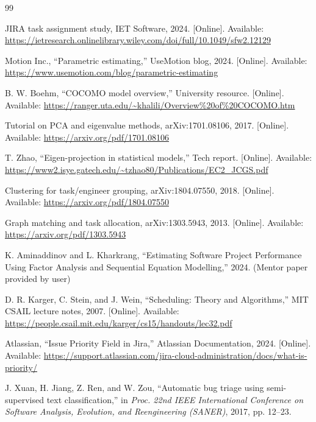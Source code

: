 \documentclass[final,1p,times]{elsarticle}
\begin{document}
\begin{thebibliography}{99}

JIRA task assignment study, IET Software, 2024. [Online]. Available: \url{https://ietresearch.onlinelibrary.wiley.com/doi/full/10.1049/sfw2.12129}

Motion Inc., ``Parametric estimating,'' UseMotion blog, 2024. [Online]. Available: \url{https://www.usemotion.com/blog/parametric-estimating}

B. W. Boehm, ``COCOMO model overview,'' University resource. [Online]. Available: \url{https://ranger.uta.edu/~khalili/Overview%20of%20COCOMO.htm}

Tutorial on PCA and eigenvalue methods, arXiv:1701.08106, 2017. [Online]. Available: \url{https://arxiv.org/pdf/1701.08106}

T. Zhao, ``Eigen-projection in statistical models,'' Tech report. [Online]. Available: \url{https://www2.isye.gatech.edu/~tzhao80/Publications/EC2_JCGS.pdf}

Clustering for task/engineer grouping, arXiv:1804.07550, 2018. [Online]. Available: \url{https://arxiv.org/pdf/1804.07550}

Graph matching and task allocation, arXiv:1303.5943, 2013. [Online]. Available: \url{https://arxiv.org/pdf/1303.5943}

K. Aminaddinov and L. Kharkrang, ``Estimating Software Project Performance Using Factor Analysis and Sequential Equation Modelling,'' 2024. (Mentor paper provided by user)

D. R. Karger, C. Stein, and J. Wein, ``Scheduling: Theory and Algorithms,'' MIT CSAIL lecture notes, 2007. [Online]. Available: \url{https://people.csail.mit.edu/karger/cs15/handouts/lec32.pdf}

Atlassian, ``Issue Priority Field in Jira,'' Atlassian Documentation, 2024. [Online]. Available: \url{https://support.atlassian.com/jira-cloud-administration/docs/what-is-priority/}

J. Xuan, H. Jiang, Z. Ren, and W. Zou, ``Automatic bug triage using semi-supervised text classification,'' in \emph{Proc. 22nd IEEE International Conference on Software Analysis, Evolution, and Reengineering (SANER)}, 2017, pp. 12–23.


\end{thebibliography}
\end{document}
